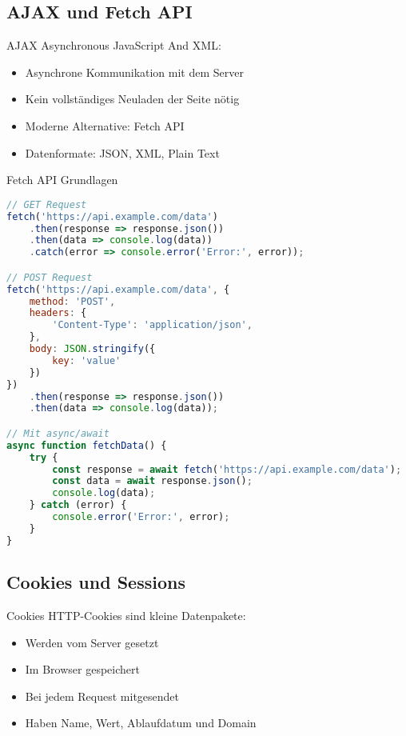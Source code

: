 \subsection{AJAX und Fetch API}

\begin{concept}{AJAX}
    Asynchronous JavaScript And XML:
    \begin{itemize}
        \item Asynchrone Kommunikation mit dem Server
        \item Kein vollständiges Neuladen der Seite nötig
        \item Moderne Alternative: Fetch API
        \item Datenformate: JSON, XML, Plain Text
    \end{itemize}
\end{concept}

\begin{KR}{Fetch API Grundlagen}
\begin{lstlisting}[language=JavaScript, style=basesmol]
// GET Request
fetch('https://api.example.com/data')
    .then(response => response.json())
    .then(data => console.log(data))
    .catch(error => console.error('Error:', error));

// POST Request
fetch('https://api.example.com/data', {
    method: 'POST',
    headers: {
        'Content-Type': 'application/json',
    },
    body: JSON.stringify({
        key: 'value'
    })
})
    .then(response => response.json())
    .then(data => console.log(data));

// Mit async/await
async function fetchData() {
    try {
        const response = await fetch('https://api.example.com/data');
        const data = await response.json();
        console.log(data);
    } catch (error) {
        console.error('Error:', error);
    }
}
\end{lstlisting}
\end{KR}

\subsection{Cookies und Sessions}

\begin{definition}{Cookies}
    HTTP-Cookies sind kleine Datenpakete:
    \begin{itemize}
        \item Werden vom Server gesetzt
        \item Im Browser gespeichert
        \item Bei jedem Request mitgesendet
        \item Haben Name, Wert, Ablaufdatum und Domain
    \end{itemize}
\end{definition}

